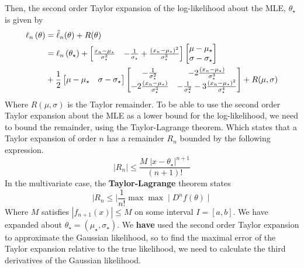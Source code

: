 \documentclass{article}
\theoremstyle{definition}
\begin{document}
Then, the second order Taylor expansion of the log-likelihood about the MLE, $\theta_{\star}$ is given by 
\begin{align}
    \ell_n\left(\theta\right) &= \hat{\ell}_n(\theta) + R(\theta) \\ & = \ell_n\left(\theta_{\star}\right) + \begin{bmatrix} \frac{x_n - \mu_{\star}}{\sigma_{\star}^2}&
-\frac{1}{\sigma_{\star}} + \frac{\left(x_n - \mu_{\star}\right)^2}{\sigma_{\star}^3}\end{bmatrix} \begin{bmatrix} \mu - \mu_{\star} \\   \sigma - \sigma_{\star} \end{bmatrix} \\ &+ \frac{1}{2} \begin{bmatrix} \mu - \mu_{\star} & \sigma - \sigma_{\star} \end{bmatrix} \begin{bmatrix}- \frac{1}{\sigma_{\star}^2} & - 2\frac{\left(x_n - \mu_{\star}\right)}{\sigma_{\star}^3} \\ -2\frac{\left(x_n - \mu_{\star}\right)}{\sigma_{\star}^3} & - \frac{1}{\sigma_{\star}^2} - 3\frac{\left(x_n - \mu_{\star}\right)^2}{\sigma_{\star}^4}\end{bmatrix}  + R(\mu, \sigma)\notag 
\end{align}
Where $R(\mu, \sigma)$ is the Taylor remainder. 
To be able to use the second order Taylor expansion about the MLE as a lower bound for the log-likelihood, we need to bound the remainder, using the Taylor-Lagrange theorem.
Which states that a Taylor expansion of order $n$ has a remainder $R_n$ bounded by the following expression. 
\begin{equation}\label{eq:taylor_lagr}
|R_n| \leq \frac{M\;|x-\theta_{\star}|^{n+1}}{\left(n+1\right)!}
\end{equation}
In the multivariate case, the \textbf{Taylor-Lagrange} theorem states
\begin{equation}\label{eq:taylor_lagr_multivar}
\mid R_n\leq \mid \frac{1}{n!}\max \max\mid D^{n} f\left(\theta\right)\mid
\end{equation}
Where $M$ satisfies $|f_{n+1}\left(x\right)| \leq M$ on some interval $I = \left[a, b\right]$. We have expanded about $\theta_{\star} = \left(\mu_{\star}, \sigma_{\star}\right)$.
We \textbf{have} used the second order Taylor expansion to approximate the Gaussian likelihood, so to find the maximal error of the Taylor expansion relative to the true likelihood, we need to calculate the third derivatives of the Gaussian likelihood.  
\end{document}

